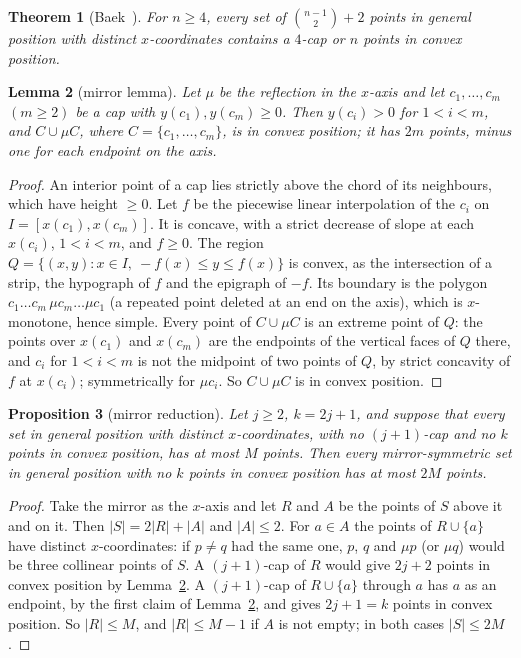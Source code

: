 \documentclass[11pt]{article}
\newtheorem{theorem}{Theorem}
\newtheorem{lemma}[theorem]{Lemma}
\newtheorem{proposition}[theorem]{Proposition}
\theoremstyle{remark}
\begin{document}
\begin{theorem}[Baek~{\cite[Thm.~1.6]{Bae25}}]\label{thm:baek}
For $n\ge4$, every set of $\binom{n-1}{2}+2$ points in general position with distinct $x$-coordinates contains a $4$-cap
or $n$ points in convex position.
\end{theorem}

\begin{lemma}[mirror lemma]\label{lem:mirror}
Let $\mu$ be the reflection in the $x$-axis and let $c_1,\dots,c_m$ $(m\ge2)$ be a cap with $y(c_1),y(c_m)\ge0$. Then
$y(c_i)>0$ for $1<i<m$, and $C\cup\mu C$, where $C=\{c_1,\dots,c_m\}$, is in convex position; it has $2m$ points, minus
one for each endpoint on the axis.
\end{lemma}
\begin{proof}
An interior point of a cap lies strictly above the chord of its neighbours, which have height $\ge0$. Let $f$ be the
piecewise linear interpolation of the $c_i$ on $I=[x(c_1),x(c_m)]$. It is concave, with a strict decrease of slope at
each $x(c_i)$, $1<i<m$, and $f\ge0$. The region $Q=\{(x,y):x\in I,\ -f(x)\le y\le f(x)\}$ is convex, as the intersection
of a strip, the hypograph of $f$ and the epigraph of $-f$. Its boundary is the polygon $c_1\dots c_m\,\mu c_m\dots\mu c_1$
(a repeated point deleted at an end on the axis), which is $x$-monotone, hence simple. Every point of $C\cup\mu C$ is an
extreme point of $Q$: the points over $x(c_1)$ and $x(c_m)$ are the endpoints of the vertical faces of $Q$ there, and
$c_i$ for $1<i<m$ is not the midpoint of two points of $Q$, by strict concavity of $f$ at $x(c_i)$; symmetrically for
$\mu c_i$. So $C\cup\mu C$ is in convex position.
\end{proof}

\begin{proposition}[mirror reduction]\label{prop:mirrorred}
Let $j\ge2$, $k=2j+1$, and suppose that every set in general position with distinct $x$-coordinates, with no $(j+1)$-cap
and no $k$ points in convex position, has at most $M$ points. Then every mirror-symmetric set in general position with no
$k$ points in convex position has at most $2M$ points.
\end{proposition}
\begin{proof}
Take the mirror as the $x$-axis and let $R$ and $A$ be the points of $S$ above it and on it. Then $|S|=2|R|+|A|$ and
$|A|\le2$. For $a\in A$ the points of $R\cup\{a\}$ have distinct $x$-coordinates: if $p\ne q$ had the same one, $p$, $q$
and $\mu p$ (or $\mu q$) would be three collinear points of $S$. A $(j+1)$-cap of $R$ would give $2j+2$ points in convex
position by Lemma~\ref{lem:mirror}. A $(j+1)$-cap of $R\cup\{a\}$ through $a$ has $a$ as an endpoint, by the first claim
of Lemma~\ref{lem:mirror}, and gives $2j+1=k$ points in convex position. So $|R|\le M$, and $|R|\le M-1$ if $A$ is not
empty; in both cases $|S|\le 2M$.
\end{proof}
\end{document}
